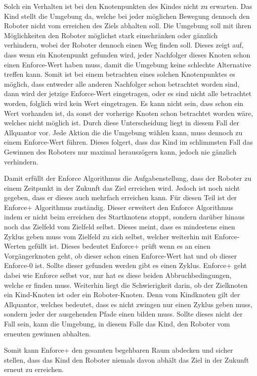 Solch ein Verhalten ist bei den Knotenpunkten des Kindes nicht zu erwarten. Das Kind stellt die Umgebung da, welche bei jeder möglichen Bewegung dennoch den Roboter nicht vom erreichen des Ziels abhalten soll. Die Umgebung soll mit ihren Möglichkeiten den Roboter möglichst stark einschränken oder gänzlich verhindern, wobei der Roboter dennoch einen Weg finden soll. Dieses zeigt auf, dass wenn ein Knotenpunkt gefunden wird, jeder Nachfolger dieses Knoten schon einen Enforce-Wert haben muss, damit die Umgebung keine schlechte Alternative treffen kann. Somit ist bei einem betrachten eines solchen Knotenpunktes es möglich, dass entweder alle anderen Nachfolger schon betrachtet worden sind, dann wird der jetzige Enforce-Wert eingetragen, oder es sind nicht alle betrachtet worden, folglich wird kein Wert eingetragen. Es kann nicht sein, dass schon ein Wert vorhanden ist, da sonst der vorherige Knoten schon betrachtet worden wäre, welches nicht möglich ist. Durch diese Unterscheidung liegt in diesem Fall der Allquantor vor. Jede Aktion die die Umgebung wählen kann, muss dennoch zu einem Enforce-Wert führen. Dieses folgert, dass das Kind im schlimmsten Fall das Gewinnen des Roboters nur maximal herauszögern kann, jedoch nie gänzlich verhindern. \par
Damit erfüllt der Enforce Algorithmus die Aufgabenstellung, dass der Roboter zu einem Zeitpunkt in der Zukunft das Ziel erreichen wird. Jedoch ist noch nicht gegeben, dass er dieses auch mehrfach erreichen kann. Für diesen Teil ist der Enforce+ Algorithmus zuständig. Dieser erweitert den Enforce Algorithmus indem er nicht beim erreichen des Startknotens stoppt, sondern darüber hinaus noch das Zielfeld vom Zielfeld selbst. Dieses meint, dass es mindestens einen Zyklus geben muss vom Zielfeld zu sich selbst, welcher weiterhin mit Enforce-Werten gefüllt ist. Dieses bedeutet Enforce+ prüft wenn es an einen Vorgängerknoten geht, ob dieser schon einen Enforce-Wert hat und ob dieser Enforce-0 ist. Sollte dieser gefunden werden gibt es einen Zyklus. Enforce+ geht dabei wie Enforce selbst vor, nur hat es diese beiden Abbruchbedingungen, welche er finden muss. Weiterhin liegt die Schwierigkeit darin, ob der Zielknoten ein Kind-Knoten ist oder ein Roboter-Knoten. Denn vom Kindknoten gilt der Allquantor, welches bedeutet, dass es nicht zwingen nur einen Zyklus geben muss, sondern jeder der ausgehenden Pfade einen bilden muss. Sollte dieses nicht der Fall sein, kann die Umgebung, in diesem Falle das Kind, den Roboter vom erneuten gewinnen abhalten. \par
Somit kann Enforce+ den gesamten begehbaren Raum abdecken und sicher stellen, dass das Kind den Roboter niemals davon abhält das Ziel in der Zukunft erneut zu erreichen. \par

